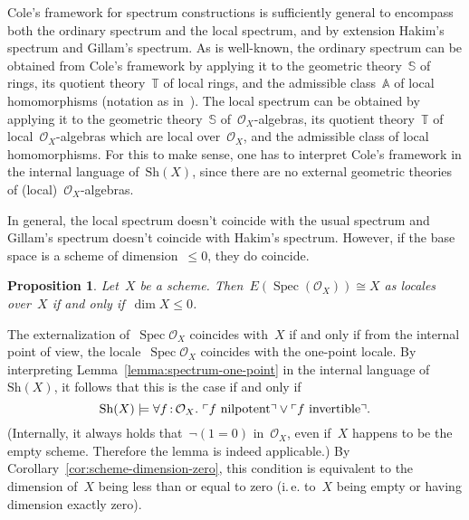 \documentclass[10pt,reqno,a4paper]{amsbook}
\makeatletter
\theoremstyle{definition}
\theoremstyle{plain}
\newtheorem{prop}[defn]{Proposition}
\theoremstyle{remark}
\renewcommand{\O}{\mathcal{O}}
\newcommand{\Sh}{\mathrm{Sh}}
\DeclareMathOperator{\Spec}{Spec}
\newcommand{\?}{\,{:}\,}
\renewcommand{\_}{\mathpunct{.}\,}
\newcommand{\speak}[1]{\ulcorner\text{\textnormal{#1}}\urcorner}
\newcommand{\ie}{i.\,e.\@\xspace}
\renewenvironment{proof}[1][\proofname]{\par
  \pushQED{\qed}%
  \normalfont \topsep6\p@\@plus6\p@\relax
  \trivlist
  \item[\hskip\labelsep
        \itshape
    #1\@addpunct{.}]\ignorespaces
}{%
  \popQED\endtrivlist\@endpefalse
}
\makeatother
\begin{document}
Cole's framework for spectrum constructions is sufficiently general to
encompass both the ordinary spectrum and the local spectrum, and by extension
Hakim's spectrum and Gillam's spectrum. As is well-known, the ordinary spectrum
can be obtained from Cole's framework by applying it to the geometric
theory~$\mathbb{S}$ of rings, its quotient theory~$\mathbb{T}$ of local rings,
and the admissible class~$\mathbb{A}$ of local homomorphisms (notation as
in~\cite[Theorem~6.58]{johnstone:topos-theory}). The local spectrum can be
obtained by applying it to the geometric theory~$\mathbb{S}$
of~$\O_X$-algebras, its quotient theory~$\mathbb{T}$ of local~$\O_X$-algebras
which are local over~$\O_X$, and the admissible class of local homomorphisms.
For this to make sense, one has to interpret Cole's framework in the internal
language of~$\Sh(X)$, since there are no external geometric theories of
(local)~$\O_X$-algebras.

In general, the local spectrum doesn't coincide with the usual spectrum and
Gillam's spectrum doesn't coincide with Hakim's spectrum. However, if the base
space is a scheme of dimension~$\leq 0$, they do coincide.

\begin{prop}\label{prop:local-spectrum-full-spectrum}
Let~$X$ be a scheme. Then~$E(\Spec(\O_X)) \cong X$ as locales
over~$X$ if and only if~$\dim X \leq 0$.\end{prop}
\begin{proof}The externalization of~$\Spec\O_X$ coincides with~$X$ if and only
if from the internal point of view, the locale~$\Spec\O_X$ coincides with the
one-point locale. By interpreting Lemma~\ref{lemma:spectrum-one-point} in the
internal language of~$\Sh(X)$, it follows that this is the case if and only if
\[ \Sh(X) \models \forall f\?\O_X\_ \speak{$f$ nilpotent} \vee \speak{$f$
invertible}. \]
(Internally, it always holds that~$\neg(1 = 0)$ in~$\O_X$, even if~$X$ happens
to be the empty scheme. Therefore the lemma is indeed applicable.) By
Corollary~\ref{cor:scheme-dimension-zero}, this condition is equivalent to the
dimension of~$X$ being less than or equal to zero (\ie to~$X$ being empty or
having dimension exactly zero).
\end{proof}
\end{document}
